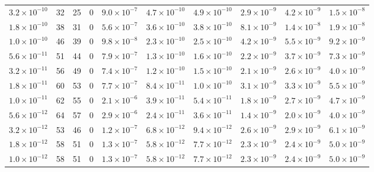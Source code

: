 \begin{tabular}{lrrrrrrrrr}
$3.2\!\times\!10^{-10}$ & 32 & 25 & 0 & $9.0\!\times\!10^{-7}$ & $4.7\!\times\!10^{-10}$ & $4.9\!\times\!10^{-10}$ & $2.9\!\times\!10^{-9}$ & $4.2\!\times\!10^{-9}$ & $1.5\!\times\!10^{-8}$\\
$1.8\!\times\!10^{-10}$ & 38 & 31 & 0 & $5.6\!\times\!10^{-7}$ & $3.6\!\times\!10^{-10}$ & $3.8\!\times\!10^{-10}$ & $8.1\!\times\!10^{-9}$ & $1.4\!\times\!10^{-8}$ & $1.9\!\times\!10^{-8}$\\
$1.0\!\times\!10^{-10}$ & 46 & 39 & 0 & $9.8\!\times\!10^{-8}$ & $2.3\!\times\!10^{-10}$ & $2.5\!\times\!10^{-10}$ & $4.2\!\times\!10^{-9}$ & $5.5\!\times\!10^{-9}$ & $9.2\!\times\!10^{-9}$\\
$5.6\!\times\!10^{-11}$ & 51 & 44 & 0 & $7.9\!\times\!10^{-7}$ & $1.3\!\times\!10^{-10}$ & $1.6\!\times\!10^{-10}$ & $2.2\!\times\!10^{-9}$ & $3.7\!\times\!10^{-9}$ & $7.3\!\times\!10^{-9}$\\
$3.2\!\times\!10^{-11}$ & 56 & 49 & 0 & $7.4\!\times\!10^{-7}$ & $1.2\!\times\!10^{-10}$ & $1.5\!\times\!10^{-10}$ & $2.1\!\times\!10^{-9}$ & $2.6\!\times\!10^{-9}$ & $4.0\!\times\!10^{-9}$\\
$1.8\!\times\!10^{-11}$ & 60 & 53 & 0 & $7.7\!\times\!10^{-7}$ & $8.4\!\times\!10^{-11}$ & $1.0\!\times\!10^{-10}$ & $3.1\!\times\!10^{-9}$ & $3.3\!\times\!10^{-9}$ & $5.5\!\times\!10^{-9}$\\
$1.0\!\times\!10^{-11}$ & 62 & 55 & 0 & $2.1\!\times\!10^{-6}$ & $3.9\!\times\!10^{-11}$ & $5.4\!\times\!10^{-11}$ & $1.8\!\times\!10^{-9}$ & $2.7\!\times\!10^{-9}$ & $4.7\!\times\!10^{-9}$\\
$5.6\!\times\!10^{-12}$ & 64 & 57 & 0 & $2.9\!\times\!10^{-6}$ & $2.4\!\times\!10^{-11}$ & $3.6\!\times\!10^{-11}$ & $1.4\!\times\!10^{-9}$ & $2.0\!\times\!10^{-9}$ & $4.0\!\times\!10^{-9}$\\
$3.2\!\times\!10^{-12}$ & 53 & 46 & 0 & $1.2\!\times\!10^{-7}$ & $6.8\!\times\!10^{-12}$ & $9.4\!\times\!10^{-12}$ & $2.6\!\times\!10^{-9}$ & $2.9\!\times\!10^{-9}$ & $6.1\!\times\!10^{-9}$\\
$1.8\!\times\!10^{-12}$ & 58 & 51 & 0 & $1.3\!\times\!10^{-7}$ & $5.8\!\times\!10^{-12}$ & $7.7\!\times\!10^{-12}$ & $2.3\!\times\!10^{-9}$ & $2.4\!\times\!10^{-9}$ & $5.0\!\times\!10^{-9}$\\
$1.0\!\times\!10^{-12}$ & 58 & 51 & 0 & $1.3\!\times\!10^{-7}$ & $5.8\!\times\!10^{-12}$ & $7.7\!\times\!10^{-12}$ & $2.3\!\times\!10^{-9}$ & $2.4\!\times\!10^{-9}$ & $5.0\!\times\!10^{-9}$\\
\bottomrule\end{tabular}